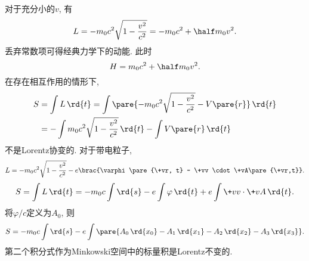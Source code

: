 \documentclass{ctexart}
\begin{document}
对于充分小的$v$, 有
\[ L = -m_0c^2 \sqrt{1-\frac{v^2}{c^2}} = -m_0c^2 + \half m_0v^2. \]
丢弃常数项可得经典力学下的动能. 此时
\[ H = m_0c^2 + \half m_0v^2. \]
在存在相互作用的情形下,
\begin{align*}
    S &= \int L\,\rd{t} = \int \pare{-m_0 c^2 \sqrt{1-\frac{v^2}{c^2}} - V\pare{r}}\,\rd{t} \\
    &= - \int m_0c^2\sqrt{1-\frac{v^2}{c^2}}\,\rd{t} - \int V\pare{r}\,\rd{t}
\end{align*}
不是Lorentz协变的. 对于带电粒子,
\[ L = -m_0c^2 \sqrt{1-\frac{v^2}{c^2}} - e\brac{\varphi\pare{\+vr, t} - \+vv \cdot\+vA\pare{\+vr,t}}. \]
\[ S = \int L\,\rd{t} = -m_0 c \int \rd{s} - e\int \varphi\,\rd{t} + e\int \+vv\cdot\+vA\,\rd{t}. \]
将$\varphi / c$定义为$A_0$, 则
\[ S = -m_0 c\int\rd{s} - e\int \pare{A_0\,\rd{x_0} - A_1\,\rd{x_1} - A_2\,\rd{x_2} - A_3\,\rd{x_3}}. \]
第二个积分式作为Minkowski空间中的标量积是Lorentz不变的.




\end{document}

